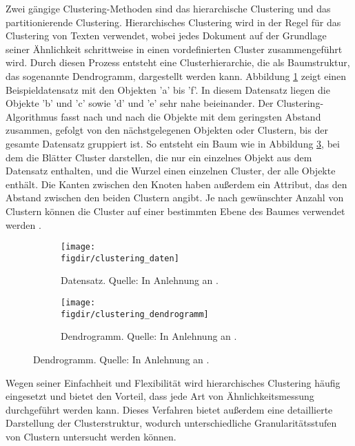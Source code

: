 Zwei gängige Clustering-Methoden sind das hierarchische Clustering und das partitionierende Clustering. Hierarchisches Clustering wird in der Regel für das Clustering von Texten verwendet, wobei jedes Dokument auf der Grundlage seiner Ähnlichkeit schrittweise in einen vordefinierten Cluster zusammengeführt wird. Durch diesen Prozess entsteht eine Clusterhierarchie, die als Baumstruktur, das sogenannte Dendrogramm, dargestellt werden kann. Abbildung \ref{f:clustering_daten} zeigt einen Beispieldatensatz mit den Objekten 'a' bis 'f'. In diesem Datensatz liegen die Objekte 'b' und 'c' sowie 'd' und 'e' sehr nahe beieinander. Der Clustering-Algorithmus fasst nach und nach die Objekte mit dem geringsten Abstand zusammen, gefolgt von den nächstgelegenen Objekten oder Clustern, bis der gesamte Datensatz gruppiert ist. So entsteht ein Baum wie in Abbildung \ref{f:clustering_baum}, bei dem die Blätter Cluster darstellen, die nur ein einzelnes Objekt aus dem Datensatz enthalten, und die Wurzel einen einzelnen Cluster, der alle Objekte enthält. Die Kanten zwischen den Knoten haben außerdem ein Attribut, das den Abstand zwischen den beiden Clustern angibt. Je nach gewünschter Anzahl von Clustern können die Cluster auf einer bestimmten Ebene des Baumes verwendet werden \cite{Suyal.2014}.

\begin{figure}[htbp]
    \centering
    \begin{subfigure}[b]{0.47\linewidth}
        \texttt{[image: \\figdir/clustering\_daten]}
        \caption{Datensatz. Quelle: In Anlehnung an \cite{Bonthu.2023}.}
        \label{f:clustering_daten}
    \end{subfigure}
    \hfill
    \begin{subfigure}[b]{0.47\linewidth}
        \texttt{[image: \\figdir/clustering\_dendrogramm]}
        \caption{Dendrogramm. Quelle: In Anlehnung an \cite{Bonthu.2023}.}
        \label{f:clustering_baum}
    \end{subfigure}
\end{figure}

Wegen seiner Einfachheit und Flexibilität wird hierarchisches Clustering häufig eingesetzt und bietet den Vorteil, dass jede Art von Ähnlichkeitsmessung durchgeführt werden kann. Dieses Verfahren bietet außerdem eine detaillierte Darstellung der Clusterstruktur, wodurch unterschiedliche Granularitätsstufen von Clustern untersucht werden können.

